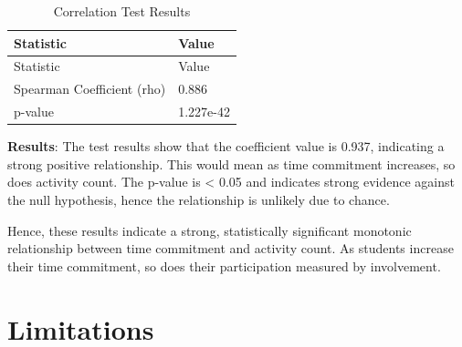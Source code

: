 \documentclass[
  letterpaper,
  DIV=11,
  numbers=noendperiod]{scrartcl}
\begin{document}
\begin{longtable}[]{@{}ll@{}}
\caption{Correlation Test Results}\tabularnewline
\toprule\noalign{}
Statistic & Value \\
\midrule\noalign{}
\endfirsthead
\toprule\noalign{}
Statistic & Value \\
\midrule\noalign{}
\endhead
\bottomrule\noalign{}
\endlastfoot
Spearman Coefficient (rho) & 0.886 \\
p-value & 1.227e-42 \\
\end{longtable}

\textbf{Results}: The test results show that the coefficient value is
0.937, indicating a strong positive relationship. This would mean as
time commitment increases, so does activity count. The p-value is
\textless{} 0.05 and indicates strong evidence against the null
hypothesis, hence the relationship is unlikely due to chance.

Hence, these results indicate a strong, statistically significant
monotonic relationship between time commitment and activity count. As
students increase their time commitment, so does their participation
measured by involvement.

\section{Limitations}\label{sec-data3}
\end{document}
